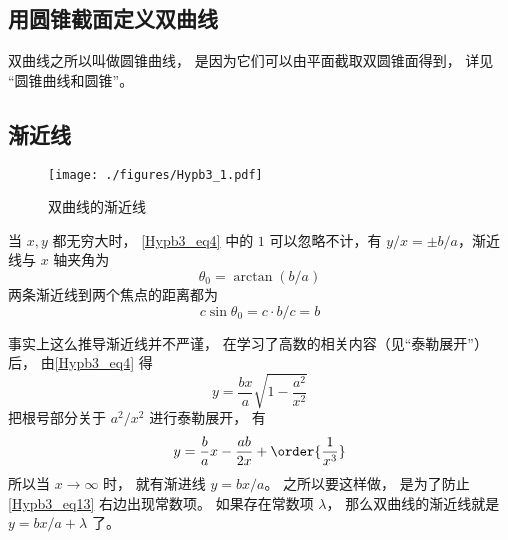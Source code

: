 \subsection{用圆锥截面定义双曲线}
双曲线之所以叫做圆锥曲线， 是因为它们可以由平面截取双圆锥面得到， 详见 “圆锥曲线和圆锥”。

\subsection{渐近线}
\begin{figure}[ht]
\centering
\texttt{[image: ./figures/Hypb3\_1.pdf]}
\caption{双曲线的渐近线} \label{Hypb3_fig1}
\end{figure}

当 $x,y$ 都无穷大时， \autoref{Hypb3_eq4} 中的 $1$ 可以忽略不计，有 $y/x = \pm b/a$，渐近线与 $x$ 轴夹角为
\begin{equation}\label{Hypb3_eq1}
\theta_0 = \arctan(b/a)
\end{equation}
两条渐近线到两个焦点的距离都为
\begin{equation}\label{Hypb3_eq11}
c\sin\theta_0 = c\cdot b/c = b
\end{equation}

事实上这么推导渐近线并不严谨， 在学习了高数的相关内容（见“泰勒展开”）后， 由\autoref{Hypb3_eq4} 得
\begin{equation}
y = \frac{bx}{a} \sqrt{1-\frac{a^2}{x^2}}
\end{equation}
把根号部分关于 $a^2/x^2$ 进行泰勒展开， 有
\begin{equation}\label{Hypb3_eq13}
y = \frac ba x - \frac{ab}{2x} + \order{\frac{1}{x^3}}
\end{equation}
所以当 $x\to\infty$ 时， 就有渐进线 $y = bx/a$。 之所以要这样做， 是为了防止\autoref{Hypb3_eq13} 右边出现常数项。 如果存在常数项 $\lambda$， 那么双曲线的渐近线就是 $y = bx/a + \lambda$ 了。












